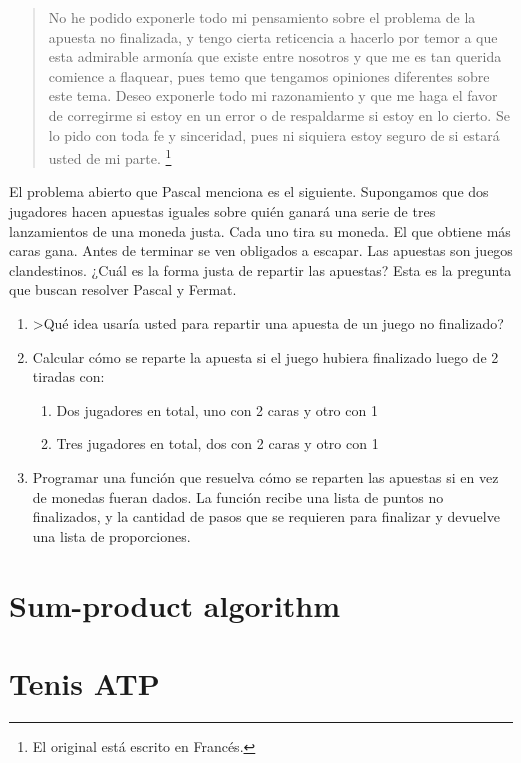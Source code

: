 \documentclass[a4paper,10pt]{article}
\begin{document}
\begin{quotation}
No he podido exponerle todo mi pensamiento sobre el problema de la apuesta no finalizada, y tengo cierta reticencia a hacerlo por temor a que esta admirable armonía que existe entre nosotros y que me es tan querida comience a flaquear, pues temo que tengamos opiniones diferentes sobre este tema.
Deseo exponerle todo mi razonamiento y que me haga el favor de corregirme si estoy en un error o de respaldarme si estoy en lo cierto.
Se lo pido con toda fe y sinceridad, pues ni siquiera estoy seguro de si estará usted de mi parte.
\footnote{El original está escrito en Francés.}
\end{quotation}

El problema abierto que Pascal menciona es el siguiente. 
Supongamos que dos jugadores hacen apuestas iguales sobre quién ganará una serie de tres lanzamientos de una moneda justa.
Cada uno tira su moneda.
El que obtiene más caras gana.
Antes de terminar se ven obligados a escapar. 
Las apuestas son juegos clandestinos.
¿Cuál es la forma justa de repartir las apuestas?
Esta es la pregunta que buscan resolver Pascal y Fermat.

\begin{enumerate}[resume]
 \item >Qué idea usaría usted para repartir una apuesta de un juego no finalizado?
 \item Calcular cómo se reparte la apuesta si el juego hubiera finalizado luego de 2 tiradas con:
 \begin{enumerate}
  \item Dos jugadores en total, uno con 2 caras y otro con 1
  \item Tres jugadores en total, dos con 2 caras y otro con 1
 \end{enumerate}
 \item Programar una función que resuelva cómo se reparten las apuestas si en vez de monedas fueran dados.
 La función recibe una lista de puntos no finalizados, y la cantidad de pasos que se requieren para finalizar y devuelve una lista de proporciones.
\end{enumerate}




\section{Sum-product algorithm}


\section{Tenis ATP} 
\end{document}
